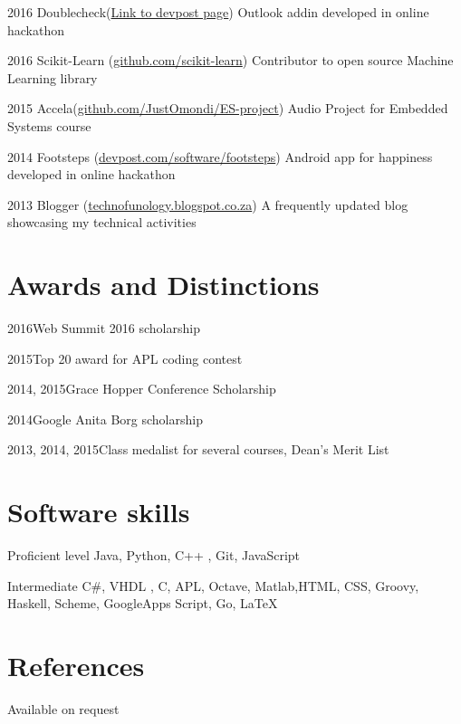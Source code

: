 \documentclass[fontsize=9pt]{tccv}
\begin{document}
\begin{yearlist}

\item{2016}
     {Doublecheck(\href{http://devpost.com/software/doublecheck}{Link to devpost page})}
     {Outlook addin developed in online hackathon}

\item{2016}
     {Scikit-Learn (\href{https://github.com/imaculate/scikit-learn}{github.com/scikit-learn})}
     {Contributor to open source Machine Learning library}

\item{2015}
     {Accela(\href{https://github.com/JustOmondi/ES-project}{github.com/JustOmondi/ES-project})}
     {Audio Project for Embedded Systems course}

\item{2014}
{Footsteps (\href{http://devpost.com/software/footsteps}{devpost.com/software/footsteps})}
{Android app for happiness developed in online hackathon}

\item{2013}
     {Blogger (\href{http://technofunology.blogspot.co.za/}{technofunology.blogspot.co.za})}
     {A frequently updated blog showcasing my technical activities}

\end{yearlist}

\section{Awards and Distinctions}

\begin{factlist}
\item{2016}{Web Summit 2016 scholarship}
\item{2015}{Top 20 award for APL coding contest}
\item{2014, 2015}{Grace Hopper Conference Scholarship }
\item{2014}{Google Anita Borg scholarship}
\item{2013, 2014, 2015}{Class medalist for several courses, Dean's Merit List}
\end{factlist}

\section{Software skills}

\begin{factlist}

\item{Proficient level}
     {Java, Python, C++ , Git, JavaScript}

\item{Intermediate}
     { C\#, VHDL , C, APL, Octave, Matlab,HTML, CSS, Groovy,
     Haskell, Scheme, GoogleApps Script,  Go, \LaTeX}

\end{factlist}


\section{References}
Available on request
\end{document}
